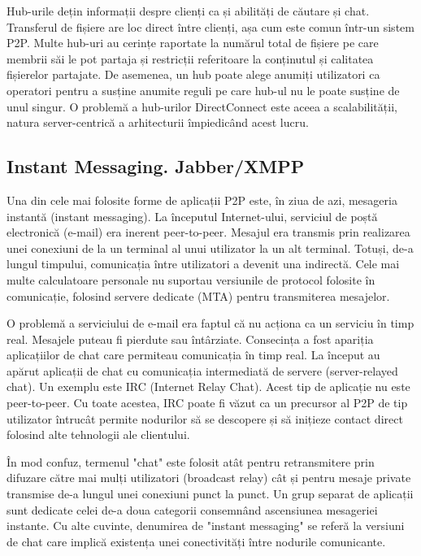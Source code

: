 Hub-urile dețin informații despre clienți ca și abilități de căutare și chat.
Transferul de fișiere are loc direct între clienți, așa cum este comun într-un
sistem P2P. Multe hub-uri au cerințe raportate la numărul total de fișiere pe
care membrii săi le pot partaja și restricții referitoare la conținutul și
calitatea fișierelor partajate. De asemenea, un hub poate alege anumiți
utilizatori ca operatori pentru a susține anumite reguli pe care hub-ul nu le
poate susține de unul singur. O problemă a hub-urilor DirectConnect este aceea
a scalabilității, natura server-centrică a arhitecturii împiedicând acest
lucru.

\subsection{Instant Messaging. Jabber/XMPP}

Una din cele mai folosite forme de aplicații P2P este, în ziua de azi,
mesageria instantă (instant messaging). La începutul Internet-ului, serviciul
de poștă electronică (e-mail) era inerent peer-to-peer. Mesajul era transmis
prin realizarea unei conexiuni de la un terminal al unui utilizator la un alt
terminal. Totuși, de-a lungul timpului, comunicația între utilizatori a
devenit una indirectă. Cele mai multe calculatoare personale nu suportau
versiunile de protocol folosite în comunicație, folosind servere dedicate
(MTA) pentru transmiterea mesajelor.

O problemă a serviciului de e-mail era faptul că nu acționa ca un serviciu în
timp real. Mesajele puteau fi pierdute sau întârziate. Consecința a fost
apariția aplicațiilor de chat care permiteau comunicația în timp real. La
început au apărut aplicații de chat cu comunicația intermediată de servere
(server-relayed chat). Un exemplu este IRC (Internet Relay Chat). Acest tip de
aplicație nu este peer-to-peer. Cu toate acestea, IRC poate fi văzut ca un
precursor al P2P de tip utilizator întrucât permite nodurilor să se descopere
și să inițieze contact direct folosind alte tehnologii ale clientului.

În mod confuz, termenul "chat" este folosit atât pentru retransmitere prin
difuzare către mai mulți utilizatori (broadcast relay) cât și pentru mesaje
private transmise de-a lungul unei conexiuni punct la punct. Un grup separat
de aplicații sunt dedicate celei de-a doua categorii consemnând ascensiunea
mesageriei instante. Cu alte cuvinte, denumirea de "instant messaging" se
referă la versiuni de chat care implică existența unei conectivități între
nodurile comunicante.

